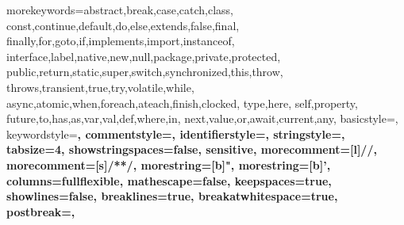 \usepackage{relsize}
\usepackage{amsmath}
\usepackage{url}

\usepackage{listings}

%
%
  {morekeywords={abstract,break,case,catch,class,%
      const,continue,default,do,else,extends,false,final,%
      finally,for,goto,if,implements,import,instanceof,%
      interface,label,native,new,null,package,private,protected,%
      public,return,static,super,switch,synchronized,this,throw,%
      throws,transient,true,try,volatile,while,%
      async,atomic,when,foreach,ateach,finish,clocked,%
      type,here,%
      self,property,%
      future,to,has,as,var,val,def,where,in,%
      next,value,or,await,current,any},%
   basicstyle=\normalfont\ttfamily,%
   keywordstyle=\bf\ttfamily,%
   commentstyle=\normalfont\ttfamily,%
   identifierstyle=\normalfont\ttfamily,%
   stringstyle=\normalfont\ttfamily,%
   tabsize=4,%
   showstringspaces=false,%
   sensitive,%
   morecomment=[l]//,%
   morecomment=[s]{/*}{*/},%
   morestring=[b]",%
   morestring=[b]',%
   columns=fullflexible,%
   mathescape=false,%
   keepspaces=true,%
   showlines=false,%
   breaklines=true,%
   breakatwhitespace=true,%
   postbreak={},%
  }

  {\lstset{language=X10,breaklines=false,captionpos=b,xleftmargin=2em,mathescape=true}}
  {}

  {\lstset{language=X10,breaklines=false,captionpos=b}} %
  {}

\lstset{language=x10,basicstyle=\ttfamily\small}


\usepackage[ruled]{algorithm} %
\usepackage[noend]{algorithmic} %
\renewcommand\algorithmiccomment[1]{// \textit{#1}} %


\usepackage{microtype}


\usepackage{pslatex}


\usepackage{xspace}
\usepackage{yglabels}
\usepackage{yglang}
\usepackage{ygequation}
\usepackage{graphicx}

